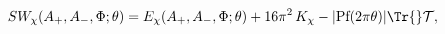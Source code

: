 \begin{equation}\label{bog}
 SW_\chi(A_+,A_-,\Phi;\theta)=E_\chi(A_+,A_-,\Phi;\theta)
 +16\pi^2\,K_\chi-
 |\text{Pf}(2\pi\theta)|\Tr{}\mathcal{T},
\end{equation} 
